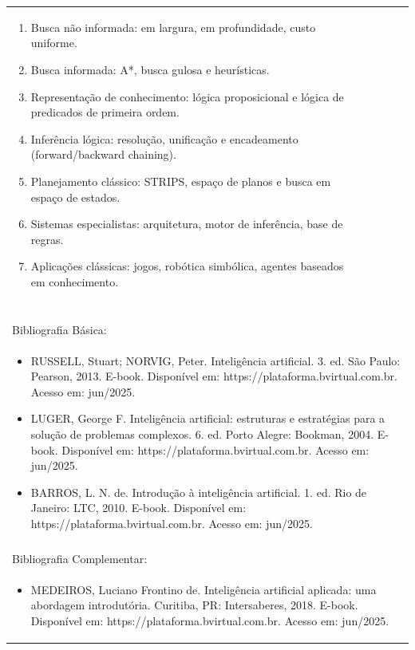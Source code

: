 \documentclass[11pt]{article}
\begin{document}
\begin{center}
\begin{longtable}{|p{4cm}|p{4cm}|p{4cm}|p{4cm}|}
{\begin{enumerate}
\item Busca não informada: em largura, em profundidade, custo uniforme.
\item Busca informada: A*, busca gulosa e heurísticas.
\item Representação de conhecimento: lógica proposicional e lógica de predicados de primeira ordem.
\item Inferência lógica: resolução, unificação e encadeamento (forward/backward chaining).
\item Planejamento clássico: STRIPS, espaço de planos e busca em espaço de estados.
\item Sistemas especialistas: arquitetura, motor de inferência, base de regras.
\item Aplicações clássicas: jogos, robótica simbólica, agentes baseados em conhecimento.\end{enumerate}}\\
\multicolumn{4}{|p{16cm}|}{}\\
\multicolumn{4}{|p{16cm}|}{}\\
\multicolumn{4}{|p{16cm}|}{\vspace{-1cm}}\\
\multicolumn{4}{|p{16cm}|}{}\\
\hline
\multicolumn{4}{|p{16cm}|}{Bibliografia Básica:}\\
\multicolumn{4}{|p{16cm}|}{%
\begin{itemize}\item RUSSELL, Stuart; NORVIG, Peter. Inteligência artificial. 3. ed. São Paulo: Pearson, 2013. E-book. Disponível em: https://plataforma.bvirtual.com.br. Acesso em: jun/2025.
\item LUGER, George F. Inteligência artificial: estruturas e estratégias para a solução de problemas complexos. 6. ed. Porto Alegre: Bookman, 2004. E-book. Disponível em: https://plataforma.bvirtual.com.br. Acesso em: jun/2025.
\item BARROS, L. N. de. Introdução à inteligência artificial. 1. ed. Rio de Janeiro: LTC, 2010. E-book. Disponível em: https://plataforma.bvirtual.com.br. Acesso em: jun/2025.\end{itemize}}\\
\multicolumn{4}{|p{16cm}|}{}\\
\hline
\multicolumn{4}{|p{16cm}|}{Bibliografia Complementar:}\\
\multicolumn{4}{|p{16cm}|}{%
\begin{itemize}\item MEDEIROS, Luciano Frontino de. Inteligência artificial aplicada: uma abordagem introdutória. Curitiba, PR: Intersaberes, 2018. E-book. Disponível em: https://plataforma.bvirtual.com.br. Acesso em: jun/2025.

\end{itemize}}
\end{longtable}
\end{center}
\end{document}
